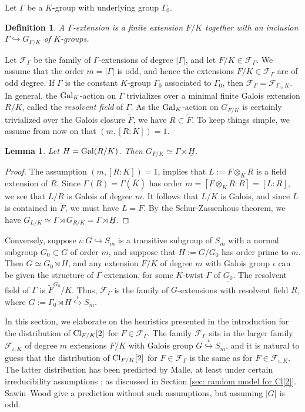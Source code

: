 \documentclass[11pt,a4paper]{amsart}
\def\Cl{{\rm Cl}}
\def\Gal{{\rm Gal}}
\numberwithin{equation}{section}
\newtheorem{lemma}[theorem]{Lemma}
\newtheorem{definition}[theorem]{Definition}
\begin{document}
Let $\Gamma$ be a $K$-group with underlying group $\Gamma_0$.
\begin{definition}
{\em     A {\it $\Gamma$-extension} is a finite extension $F/K$ together with an inclusion $\Gamma \hookrightarrow G_{F/K}$ of $K$-groups.}
\end{definition}  
Let $\mathcal{F}_\Gamma$ be the family of $\Gamma$-extensions of degree $|\Gamma|$, and let $F/K \in \mathcal{F}_\Gamma$.  We assume that the order $m = |\Gamma|$ is odd, and hence the extensions $F/K \in \mathcal{F}_\Gamma$ are of odd degree. 
 If $\Gamma$ is the constant $K$-group $\underline{\Gamma_0}$ associated to $\Gamma_0$, then $\mathcal{F}_\Gamma = \mathcal{F}_{\Gamma_0,K}$.  
In general, the $\Gal_K$-action on $\Gamma$ trivializes over a minimal finite Galois extension $R/K$, called the {\it resolvent field} of $\Gamma$. As the $\Gal_K$-action on $G_{F/K}$ is certainly trivialized over the Galois closure $\tilde F$, we have $R \subset \tilde F$. To keep things simple, we assume from now on that $(m, [R \colon K]) = 1$.
\begin{lemma}
    Let $H = \Gal(R/K)$. Then $ G_{F/K} \simeq \Gamma \rtimes \underline{H}$.  
\end{lemma}
\begin{proof}
    The assumption $(m, [R \colon K]) = 1$, implies that $L:= F \otimes_K R$ is a field extension of $R$. Since $\Gamma(R) = \Gamma(\overline{K})$ has order $m = [F\otimes_K R \colon R] = [L \colon R]$, we see that $L/R$ is Galois of degree $m$. It follows that $L/K$ is Galois, and since $L$ is contained in $\tilde F$, we must have $L = \tilde F$. By the Schur-Zassenhous theorem, we have $G_{L/K} \simeq \Gamma \rtimes G_{R/K} = \Gamma \rtimes \underline{H}$. 
\end{proof}

 Conversely, suppose $ \iota \colon G \hookrightarrow S_m$ is a transitive subgroup of $S_m$ with a normal subgroup $G_0 \subset G$ of order $m$, and suppose that $H := G/G_0$ has order prime to $m$. Then $G \simeq G_0 \rtimes H$, and any extension $F/K$ of degree $m$ with Galois group $\iota$ can be given the structure of $\Gamma$-extension, for some $K$-twist $\Gamma$ of $\underline{G_0}$. The resolvent field of $\Gamma$ is $\tilde F^{G_0}/K$. Thus, $\mathcal{F}_\Gamma$ is the family of $G$-extensions with resolvent field $R$, where $G:= \Gamma_0 \rtimes H \stackrel{\iota}{\hookrightarrow} S_m$. 

In this section, we elaborate on the heuristics presented in the introduction for the distribution of $\Cl_{F/K}[2]$ for $F \in \mathcal{F}_\Gamma$.  The family $\mathcal{F}_\Gamma$ sits in the larger family $\mathcal{F}_{\iota,K}$ of degree $m$ extensions $F/K$ with Galois group $G \stackrel{\iota}{\hookrightarrow} S_m$, and it is natural to guess that the distribution of $\Cl_{F/K}[2]$ for $F \in \mathcal{F}_\Gamma$ is the same as for $F \in \mathcal{F}_{\iota, K}$. The latter distribution has been predicted by Malle, at least under certain  irreducibility assumptions \cite{Malle2010, AdamMalle}; as discussed in Section \ref{sec: random model for Cl[2]}. Sawin--Wood give a prediction without such assumptions, but assuming $|G|$ is odd. 
\end{document}
